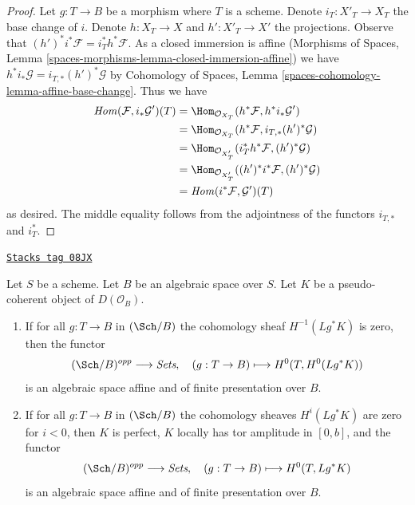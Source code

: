 \begin{proof}
Let $g : T \to B$ be a morphism where $T$ is a scheme.
Denote $i_T : X'_T \to X_T$ the base change of $i$.
Denote $h : X_T \to X$ and $h' : X'_T \to X'$ the projections.
Observe that $(h')^*i^*\mathcal{F} = i_T^*h^*\mathcal{F}$.
As a closed immersion is affine
(Morphisms of Spaces, Lemma
\ref{spaces-morphisms-lemma-closed-immersion-affine})
we have $h^*i_*\mathcal{G} = i_{T, *}(h')^*\mathcal{G}$ by
Cohomology of Spaces, Lemma \ref{spaces-cohomology-lemma-affine-base-change}.
Thus we have
\begin{align*}
\mathit{Hom}(\mathcal{F}, i_*\mathcal{G}')(T)
& =
\Hom_{\mathcal{O}_{X_T}}(h^*\mathcal{F}, h^*i_*\mathcal{G}') \\
& =
\Hom_{\mathcal{O}_{X_T}}(h^*\mathcal{F}, i_{T, *}(h')^*\mathcal{G}) \\
& =
\Hom_{\mathcal{O}_{X'_T}}(i_T^*h^*\mathcal{F}, (h')^*\mathcal{G}) \\
& =
\Hom_{\mathcal{O}_{X'_T}}((h')^*i^*\mathcal{F}, (h')^*\mathcal{G}) \\
& =
\mathit{Hom}(i^*\mathcal{F}, \mathcal{G}')(T)
\end{align*}
as desired. The middle equality follows from the adjointness of the functors
$i_{T, *}$ and $i_T^*$.
\end{proof}

\begin{lemma}
\label{quot-lemma-cohomology-perfect-complex}
\href{https://stacks.math.columbia.edu/tag/08JX}{\texttt{Stacks tag 08JX}}

Let $S$ be a scheme. Let $B$ be an algebraic space over $S$.
Let $K$ be a pseudo-coherent object of $D(\mathcal{O}_B)$.
\begin{enumerate}
\item If for all $g : T \to B$ in $(\Sch/B)$ the cohomology sheaf
$H^{-1}(Lg^*K)$ is zero, then the functor
$$
(\Sch/B)^{opp} \longrightarrow \textit{Sets},\quad
(g : T \to B) \longmapsto H^0(T, H^0(Lg^*K))
$$
is an algebraic space affine and of finite presentation over $B$.
\item If for all $g : T \to B$ in $(\Sch/B)$ the cohomology sheaves
$H^i(Lg^*K)$ are zero for $i < 0$, then $K$ is perfect,
$K$ locally has tor amplitude in $[0, b]$, and the functor
$$
(\Sch/B)^{opp} \longrightarrow \textit{Sets},\quad
(g : T \to B) \longmapsto H^0(T, Lg^*K)
$$
is an algebraic space affine and of finite presentation over $B$.
\end{enumerate}
\end{lemma}

